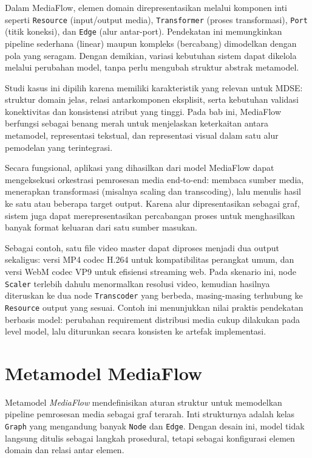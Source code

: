 Dalam MediaFlow, elemen domain direpresentasikan melalui komponen inti seperti \texttt{Resource} (input/output media), \texttt{Transformer} (proses transformasi), \texttt{Port} (titik koneksi), dan \texttt{Edge} (alur antar-port). Pendekatan ini memungkinkan pipeline sederhana (linear) maupun kompleks (bercabang) dimodelkan dengan pola yang seragam. Dengan demikian, variasi kebutuhan sistem dapat dikelola melalui perubahan model, tanpa perlu mengubah struktur abstrak metamodel.

Studi kasus ini dipilih karena memiliki karakteristik yang relevan untuk MDSE: struktur domain jelas, relasi antarkomponen eksplisit, serta kebutuhan validasi konektivitas dan konsistensi atribut yang tinggi. Pada bab ini, MediaFlow berfungsi sebagai benang merah untuk menjelaskan keterkaitan antara metamodel, representasi tekstual, dan representasi visual dalam satu alur pemodelan yang terintegrasi.

Secara fungsional, aplikasi yang dihasilkan dari model MediaFlow dapat mengeksekusi orkestrasi pemrosesan media end-to-end: membaca sumber media, menerapkan transformasi (misalnya scaling dan transcoding), lalu menulis hasil ke satu atau beberapa target output. Karena alur dipresentasikan sebagai graf, sistem juga dapat merepresentasikan percabangan proses untuk menghasilkan banyak format keluaran dari satu sumber masukan.

Sebagai contoh, satu file video master dapat diproses menjadi dua output sekaligus: versi MP4 codec H.264 untuk kompatibilitas perangkat umum, dan versi WebM codec VP9 untuk efisiensi streaming web. Pada skenario ini, node \texttt{Scaler} terlebih dahulu menormalkan resolusi video, kemudian hasilnya diteruskan ke dua node \texttt{Transcoder} yang berbeda, masing-masing terhubung ke \texttt{Resource} output yang sesuai. Contoh ini menunjukkan nilai praktis pendekatan berbasis model: perubahan requirement distribusi media cukup dilakukan pada level model, lalu diturunkan secara konsisten ke artefak implementasi.

\section{Metamodel MediaFlow}
\label{sec:metamodel-mediaflow}

Metamodel \textit{MediaFlow} mendefinisikan aturan struktur untuk memodelkan pipeline pemrosesan media sebagai graf terarah. Inti strukturnya adalah kelas \texttt{Graph} yang mengandung banyak \texttt{Node} dan \texttt{Edge}. Dengan desain ini, model tidak langsung ditulis sebagai langkah prosedural, tetapi sebagai konfigurasi elemen domain dan relasi antar elemen.

